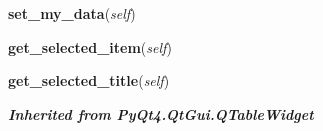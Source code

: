     \vspace{0.5ex}

\hspace{.8\funcindent}\begin{boxedminipage}{\funcwidth}

    \raggedright \textbf{set\_my\_data}(\textit{self})

\setlength{\parskip}{2ex}
\setlength{\parskip}{1ex}
    \end{boxedminipage}

    \label{BookTable:BookTable:get_selected_item}

    \vspace{0.5ex}

\hspace{.8\funcindent}\begin{boxedminipage}{\funcwidth}

    \raggedright \textbf{get\_selected\_item}(\textit{self})

\setlength{\parskip}{2ex}
\setlength{\parskip}{1ex}
    \end{boxedminipage}

    \label{BookTable:BookTable:get_selected_title}

    \vspace{0.5ex}

\hspace{.8\funcindent}\begin{boxedminipage}{\funcwidth}

    \raggedright \textbf{get\_selected\_title}(\textit{self})

\setlength{\parskip}{2ex}
\setlength{\parskip}{1ex}
    \end{boxedminipage}


\large{\textbf{\textit{Inherited from PyQt4.QtGui.QTableWidget}}}

